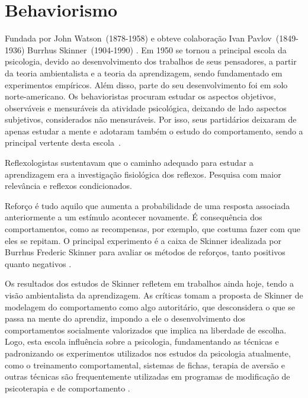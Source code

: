 \section{Behaviorismo}\label{behaviorismo}

Fundada por John Watson~(1878-1958) e obteve colaboração Ivan Pavlov~(1849-1936) Burrhus Skinner~(1904-1990) \cite{hothersall1997historia}.
Em 1950 se tornou a principal escola da psicologia, devido ao desenvolvimento dos trabalhos de seus pensadores, a partir da teoria ambientalista e a teoria da aprendizagem, sendo fundamentado em experimentos empíricos.
Além disso, parte do seu desenvolvimento foi em solo norte-americano.
Os behavioristas procuram estudar os aspectos objetivos, observáveis e mensuráveis da atividade psicológica, deixando de lado aspectos subjetivos, considerados não mensuráveis. 
Por isso, seus partidários deixaram de apenas estudar a mente e adotaram também o estudo do comportamento, sendo a principal vertente desta escola~\cite{bock1999psicologias}.

Reflexologistas sustentavam que o caminho adequado para estudar a aprendizagem era a investigação fisiológica dos reflexos. Pesquisa com maior relevância e reflexos condicionados.

Reforço é tudo aquilo que aumenta a probabilidade de uma resposta associada anteriormente a um estímulo acontecer novamente. É consequência dos comportamentos, como as recompensas, por exemplo, que costuma fazer com que eles se repitam.
O principal experimento é a caixa de Skinner idealizada por Burrhus Frederic Skinner para avaliar os  métodos de reforços, tanto positivos quanto negativos \cite{silva2007psicologia_educacao}.

Os resultados dos estudos de Skinner refletem em trabalhos ainda hoje, tendo a visão ambientalista da aprendizagem. 
As críticas tomam a proposta de Skinner de modelagem do comportamento como algo autoritário, que desconsidera o que se passa na mente do aprendiz, impondo a ele o desenvolvimento dos comportamentos
socialmente valorizados que implica na liberdade de escolha.
Logo, esta escola influência  sobre a psicologia, fundamentando as técnicas e padronizando os experimentos utilizados nos estudos da psicologia atualmente, como o treinamento comportamental, sistemas de fichas, terapia de aversão e outras técnicas são frequentemente utilizadas em programas de modificação de psicoterapia e de comportamento \cite{sternberg2000psicologia}.
